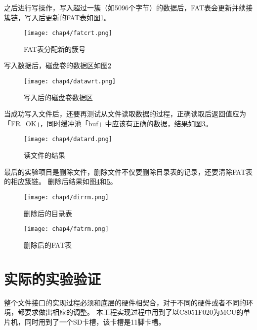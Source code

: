 之后进行写操作，写入超过一簇（如5096个字节）的数据后，FAT表会更新并续接簇链，写入后更新的FAT表如图\ref{fig:fatcrt}。

\begin{figure}[!htbp]
    \centering
    \texttt{[image: chap4/fatcrt.png]}
    \\
    \caption{FAT表分配新的簇号} \label{fig:fatcrt}
\end{figure}

写入数据后，磁盘卷的数据区如图\ref{fig:datawrt}

\begin{figure}[!htbp]
    \centering
    \texttt{[image: chap4/datawrt.png]}
    \\
    \caption{写入后的磁盘卷数据区} \label{fig:datawrt}
\end{figure}

当成功写入文件后，还要再测试从文件读取数据的过程，正确读取后返回值应为「FR\_OK」，同时缓冲池「buf」中应该有正确的数据，结果如图\ref{fig:datard}。

\begin{figure}[!htbp]
    \centering
    \texttt{[image: chap4/datard.png]}
    \\
    \caption{读文件的结果} \label{fig:datard}
\end{figure}

最后的实验项目是删除文件，删除文件不仅要删除目录表的记录，还要清除FAT表的相应簇链。
删除后结果如图\ref{fig:dirrm}和\ref{fig:fatrm}。

\begin{figure}[!htbp]
    \centering
    \texttt{[image: chap4/dirrm.png]}
    \\
    \caption{删除后的目录表} \label{fig:dirrm}
\end{figure}

\begin{figure}[!htbp]
    \centering
    \texttt{[image: chap4/fatrm.png]}
    \\
    \caption{删除后的FAT表} \label{fig:fatrm}
\end{figure}

\section{实际的实验验证}
\label{sec:ExpDriver}
整个文件接口的实现过程必须和底层的硬件相契合，对于不同的硬件或者不同的环境，都要求做出相应的调整。
本工程实现过程中用到了以C8051F020为MCU的单片机，同时用到了一个SD卡槽，该卡槽是11脚卡槽。

